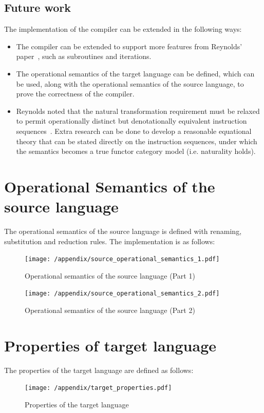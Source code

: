 \documentclass[12pt,a4paper]{report}
\theoremstyle{definition}
\begin{document}
    \section{Future work}
    The implementation of the compiler can be extended in the following ways:
    \begin{itemize}
        \item 
            The compiler can be extended to support more features from Reynolds' paper~\autocite{Reynolds}, such as subroutines and iterations.
        \item
            The operational semantics of the target language can be defined, which can be used, along with the operational semantics of the source language, to prove the correctness of the compiler.
        \item
            Reynolds noted that the natural transformation requirement must be relaxed to permit operationally distinct but denotationally equivalent instruction sequences~\autocite[Ch.~6]{Reynolds}. Extra research can be done to develop a reasonable equational theory that can be stated directly on the instruction sequences, under which the semantics becomes a true functor category model (i.e. naturality holds).
    \end{itemize}

\printbibliography

\appendix

\chapter{Operational Semantics of the source language} \label{app: operational_semantics}
    The operational semantics of the source language is defined with renaming, substitution and reduction rules. The implementation is as follows:
    \begin{figure}[H]
        \centering
        \texttt{[image: /appendix/source\_operational\_semantics\_1.pdf]}
        \caption{Operational semantics of the source language (Part 1)}
        \label{fig: operational_semantics_1}
    \end{figure}
    \begin{figure}[H]
        \centering
        \texttt{[image: /appendix/source\_operational\_semantics\_2.pdf]}
        \caption{Operational semantics of the source language (Part 2)}
        \label{fig: operational_semantics_2}
    \end{figure}

\chapter{Properties of target language} \label{app: target_properties}
    The properties of the target language are defined as follows:
    \begin{figure}[H]
        \centering
        \texttt{[image: /appendix/target\_properties.pdf]}
        \caption{Properties of the target language}
        \label{fig: target_properties}
    \end{figure}
\end{document}
